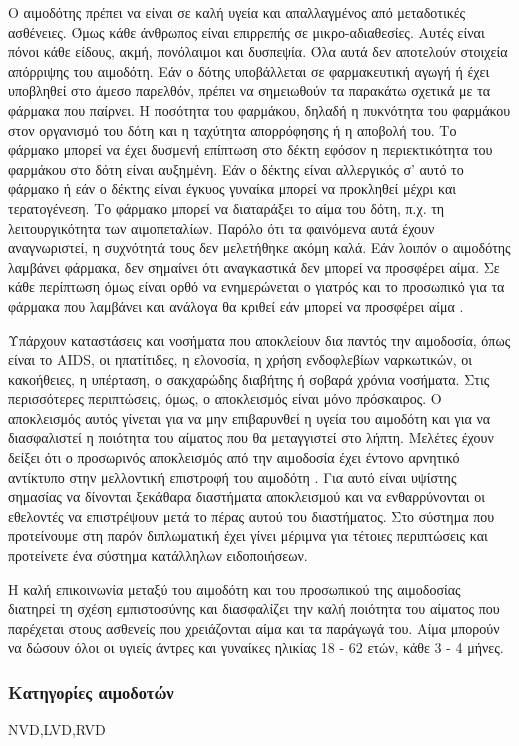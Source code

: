 			Ο αιμοδότης πρέπει να είναι σε καλή υγεία και απαλλαγμένος από μεταδοτικές ασθένειες. Όμως κάθε άνθρωπος είναι επιρρεπής σε μικρο-αδιαθεσίες. Αυτές είναι πόνοι κάθε είδους, ακμή, πονόλαιμοι και δυσπεψία. Όλα αυτά δεν αποτελούν στοιχεία απόρριψης του αιμοδότη. Εάν ο δότης υποβάλλεται σε φαρμακευτική αγωγή ή έχει υποβληθεί στο άμεσο παρελθόν, πρέπει να σημειωθούν τα παρακάτω σχετικά με τα φάρμακα που παίρνει. Η ποσότητα του φαρμάκου, δηλαδή η πυκνότητα του φαρμάκου στον οργανισμό του δότη και η ταχύτητα απορρόφησης ή η αποβολή του. Το φάρμακο μπορεί να έχει δυσμενή επίπτωση στο δέκτη εφόσον η περιεκτικότητα του φαρμάκου στο δότη είναι αυξημένη. Εάν ο δέκτης είναι αλλεργικός σ' αυτό το φάρμακο ή εάν ο δέκτης είναι έγκυος γυναίκα μπορεί να προκληθεί μέχρι και τερατογένεση. Το φάρμακο μπορεί να διαταράξει το αίμα του δότη, π.χ. τη λειτουργικότητα των αιμοπεταλίων. Παρόλο ότι τα φαινόμενα αυτά έχουν αναγνωριστεί, η συχνότητά τους δεν μελετήθηκε ακόμη καλά. Εάν λοιπόν ο αιμοδότης λαμβάνει φάρμακα, δεν σημαίνει ότι αναγκαστικά δεν μπορεί να προσφέρει αίμα. Σε κάθε περίπτωση όμως είναι ορθό να ενημερώνεται ο γιατρός και το προσωπικό για τα φάρμακα που λαμβάνει και ανάλογα θα κριθεί εάν μπορεί να προσφέρει αίμα \cite{bloodDonorSelection}. 
			
		Υπάρχουν καταστάσεις και νοσήματα που αποκλείουν δια παντός την αιμοδοσία, όπως είναι το AIDS, οι ηπατίτιδες, η ελονοσία, η χρήση ενδοφλεβίων ναρκωτικών, οι κακοήθειες, η υπέρταση, ο σακχαρώδης διαβήτης ή σοβαρά χρόνια νοσήματα. Στις περισσότερες περιπτώσεις, όμως, ο αποκλεισμός είναι μόνο πρόσκαιρος.  Ο αποκλεισμός αυτός γίνεται για να μην επιβαρυνθεί η υγεία του αιμοδότη και για να διασφαλιστεί η ποιότητα του αίματος που θα μεταγγιστεί στο λήπτη. Μελέτες έχουν δείξει ότι ο προσωρινός αποκλεισμός από την αιμοδοσία έχει έντονο αρνητικό αντίκτυπο στην μελλοντική επιστροφή του αιμοδότη \cite{Custer2011}\cite{Custer2007}. Για αυτό είναι υψίστης σημασίας να δίνονται ξεκάθαρα διαστήματα αποκλεισμού και να ενθαρρύνονται οι εθελοντές να επιστρέψουν μετά το πέρας αυτού του διαστήματος. Στο σύστημα που προτείνουμε στη παρόν διπλωματική έχει γίνει μέριμνα για τέτοιες περιπτώσεις και προτείνετε ένα σύστημα κατάλληλων ειδοποιήσεων.
		
		Η καλή επικοινωνία μεταξύ του αιμοδότη και του προσωπικού της αιμοδοσίας διατηρεί τη σχέση εμπιστοσύνης και διασφαλίζει την καλή ποιότητα του αίματος που παρέχεται στους ασθενείς που χρειάζονται αίμα και τα παράγωγά του. Αίμα μπορούν να δώσουν όλοι οι υγιείς άντρες και γυναίκες ηλικίας 18 - 62 ετών, κάθε 3 - 4 μήνες. 
		\subsubsection{Κατηγορίες αιμοδοτών}
			NVD,LVD,RVD
